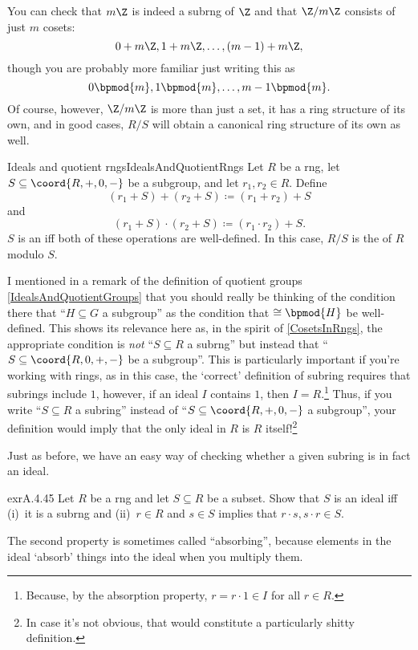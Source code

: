 You can check that $m\Z$ is indeed a subrng of $\Z$ and that $\Z /m\Z$ consists of just $m$ cosets:
\begin{equation}
0+m\Z ,1+m\Z ,\ldots ,(m-1)+m\Z,
\end{equation}
though you are probably more familiar just writing this as
\begin{equation}
0\bpmod{m},1\bpmod{m},\ldots ,m-1\bpmod{m}.
\end{equation}
Of course, however, $\Z /m\Z$ is more than just a set, it has a ring structure of its own, and in good cases, $R/S$ will obtain a canonical ring structure of its own as well.
\begin{dfn}{Ideals and quotient rngs}{IdealsAndQuotientRngs}
Let $R$ be a rng, let $S\subseteq \coord{R,+,0,-}$ be a subgroup, and let $r_1,r_2\in R$.  Define
\begin{equation}
(r_1+S)+(r_2+S)\coloneqq (r_1+r_2)+S
\end{equation}
and
\begin{equation}
(r_1+S)\cdot (r_2+S)\coloneqq (r_1\cdot r_2)+S.
\end{equation}
$S$ is an  iff both of these operations are well-defined.  In this case, $R/S$ is the  of $R$ modulo $S$.
\begin{rmk}
I mentioned in a remark of the definition of quotient groups \cref{IdealsAndQuotientGroups} that you should really be thinking of the condition there that ``$H\subseteq G$ a subgroup'' as the condition that $\cong \bpmod{H}$ be well-defined.  This shows its relevance here as, in the spirit of \cref{CosetsInRngs}, the appropriate condition is \emph{not} ``$S\subseteq R$ a subrng'' but instead that ``$S\subseteq \coord{R,0,+,-}$ be a subgroup''.  This is particularly important if you're working with rings, as in this case, the `correct' definition of subring requires that subrings include $1$, however, if an ideal $I$ contains $1$, then $I=R$.\footnote{Because, by the absorption property, $r=r\cdot 1\in I$ for all $r\in R$.}  Thus, if you write ``$S\subseteq R$ a subring'' instead of ``$S\subseteq \coord{R,+,0,-}$ a subgroup'', your definition would imply that the only ideal in $R$ is $R$ itself!\footnote{In case it's not obvious, that would constitute a particularly shitty definition.}
\end{rmk}
\end{dfn}
Just as before, we have an easy way of checking whether a given subring is in fact an ideal.
\begin{exr}{}{exrA.4.45}
Let $R$ be a rng and let $S\subseteq R$ be a subset.  Show that $S$ is an ideal iff (i)~it is a subrng and (ii)~$r\in R$ and $s\in S$ implies that $r\cdot s,s\cdot r\in S$.
\begin{rmk}
The second property is sometimes called ``absorbing'', because elements in the ideal `absorb' things into the ideal when you multiply them.
\end{rmk}
\end{exr}
